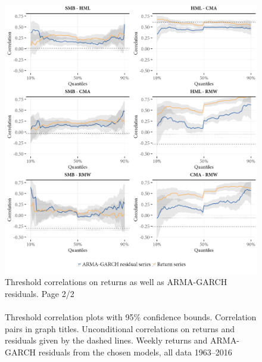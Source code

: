 \begin{figure}[H]
  \centering
  \footnotesize
  \caption{Threshold correlations on returns as well as ARMA-GARCH residuals. Page 2/2 \\ \quad \\
  Threshold correlation plots with 95\% confidence bounds. Correlation pairs in graph titles. Unconditional correlations on returns and residuals given by the dashed lines. Weekly returns and ARMA-GARCH residuals from the chosen models, all data 1963--2016}
  \label{fig:appendix_threshold2}
  \includegraphics[scale=1]{graphics/appendix_threshold_2.png}  
\end{figure}

\newpage

